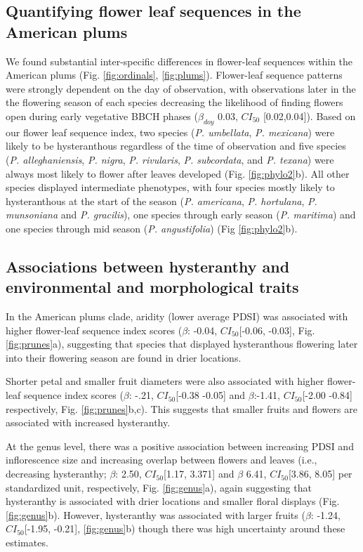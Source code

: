 \documentclass{article}[12pt]
\begin{document}
{\subsection*{Quantifying flower leaf sequences in the American plums}
We found substantial inter-specific differences in flower-leaf sequences within the American plums (Fig. \ref{fig:ordinals}, \ref{fig:plums}). Flower-leaf sequence patterns were strongly dependent on the day of observation, with observations later in the the flowering season of each species decreasing the likelihood of finding flowers open during early vegetative BBCH phases ($\beta_{doy}$ 0.03, $CI_{50}$ [0.02,0.04]). Based on our flower leaf sequence index, two species (\textit{P. umbellata}, \textit{P. mexicana}) were likely to be hysteranthous regardless of the time of observation and five species (\textit{P. alleghaniensis}, \textit{P. nigra}, \textit{P. rivularis}, \textit{P. subcordata}, and \textit{P. texana}) were always most likely to flower after leaves developed (Fig. \ref{fig:phylo2}b). All other species displayed intermediate phenotypes, with four species mostly likely to hysteranthous at the start of the season (\textit{P. americana}, \textit{P. hortulana}, \textit{P. munsoniana} and \textit{P. gracilis}), one species through early season (\textit{P. maritima}) and one species through mid season (\textit{P. angustifolia}) (Fig \ref{fig:phylo2}b).

\subsection*{Associations between hysteranthy and environmental and morphological traits}
In the American plums clade, aridity (lower average PDSI) was associated with higher flower-leaf sequence index scores ($\beta$: -0.04, $CI_{50}$[-0.06,  -0.03], Fig. \ref{fig:prunes}a), suggesting that species that displayed hysteranthous flowering later into their flowering season are found in drier locations. 

Shorter petal and smaller fruit diameters were also associated with higher flower-leaf sequence index scores ($\beta$: -.21, $CI_{50}$[-0.38 -0.05] and $\beta$:-1.41, $CI_{50}$[-2.00 -0.84] respectively, Fig. \ref{fig:prunes}b,c). This suggests that smaller fruits and flowers are associated with increased hysteranthy.

At the genus level, there was a positive association between increasing PDSI and inflorescence size and increasing overlap between flowers and leaves (i.e., decreasing hysteranthy; $\beta$: 2.50, $CI_{50}$[1.17, 3.371] and $\beta$ 6.41, $CI_{50}$[3.86, 8.05]  per standardized unit, respectively, Fig. \ref{fig:genus}a), again suggesting that hysteranthy is associated with drier locations and smaller floral displays (Fig. \ref{fig:genus}b). However, hysteranthy was associated with larger fruits  ($\beta$: -1.24, $CI_{50}$[-1.95, -0.21], \ref{fig:genus}b)  though there was high uncertainty around these estimates. 

}
\end{document}
